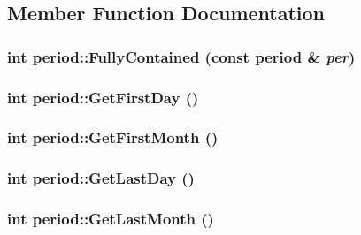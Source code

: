\subsection{Member Function Documentation}
\hypertarget{classperiod_adfabc7cac131ab21bd24e488a2813ee8}{
\subsubsection[{FullyContained}]{\setlength{\rightskip}{0pt plus 5cm}int period::FullyContained (const {\bf period} \& {\em per})}}
\label{classperiod_adfabc7cac131ab21bd24e488a2813ee8}
\hypertarget{classperiod_ab37ca75242f6032b529e8e1d6ccfa2ef}{
\subsubsection[{GetFirstDay}]{\setlength{\rightskip}{0pt plus 5cm}int period::GetFirstDay ()}}
\label{classperiod_ab37ca75242f6032b529e8e1d6ccfa2ef}
\hypertarget{classperiod_a82ce05d97cf5ba02cb6045cd746d502f}{
\subsubsection[{GetFirstMonth}]{\setlength{\rightskip}{0pt plus 5cm}int period::GetFirstMonth ()}}
\label{classperiod_a82ce05d97cf5ba02cb6045cd746d502f}
\hypertarget{classperiod_a9df06cfc009724e0d2ca926b8d161062}{
\subsubsection[{GetLastDay}]{\setlength{\rightskip}{0pt plus 5cm}int period::GetLastDay ()}}
\label{classperiod_a9df06cfc009724e0d2ca926b8d161062}
\hypertarget{classperiod_a44a437719b012f10621691d2249068a1}{
\subsubsection[{GetLastMonth}]{\setlength{\rightskip}{0pt plus 5cm}int period::GetLastMonth ()}}
